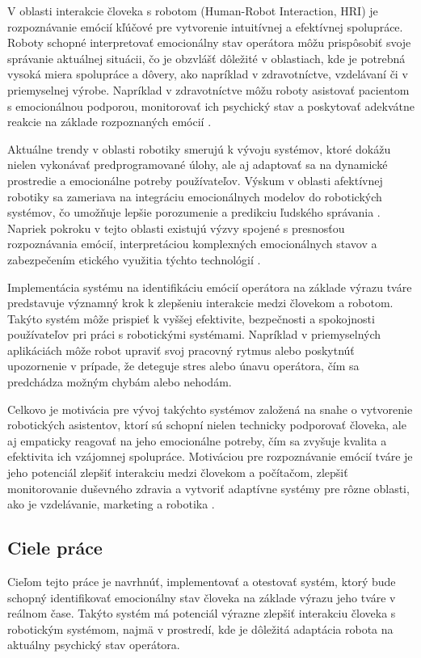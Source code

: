 V oblasti interakcie človeka s robotom (Human-Robot Interaction, HRI) je rozpoznávanie emócií kľúčové pre vytvorenie intuitívnej a efektívnej spolupráce. Roboty schopné interpretovať emocionálny stav operátora 
môžu prispôsobiť svoje správanie aktuálnej situácii, čo je obzvlášť dôležité v oblastiach, kde je potrebná vysoká miera spolupráce a dôvery, ako napríklad v zdravotníctve, vzdelávaní či v priemyselnej výrobe. 
Napríklad v zdravotníctve môžu roboty asistovať pacientom s emocionálnou podporou, monitorovať ich psychický stav a poskytovať adekvátne reakcie na základe rozpoznaných emócií \cite{article01}.

Aktuálne trendy v oblasti robotiky smerujú k vývoju systémov, ktoré dokážu nielen vykonávať predprogramované úlohy, ale aj adaptovať sa na dynamické prostredie a emocionálne potreby používateľov. 
Výskum v oblasti afektívnej robotiky sa zameriava na integráciu emocionálnych modelov do robotických systémov, čo umožňuje lepšie porozumenie a predikciu ľudského správania . Napriek pokroku v tejto oblasti existujú 
výzvy spojené s presnosťou rozpoznávania emócií, interpretáciou komplexných emocionálnych stavov a zabezpečením etického využitia týchto technológií \cite{article01}.

Implementácia systému na identifikáciu emócií operátora na základe výrazu tváre predstavuje významný krok k zlepšeniu interakcie medzi človekom a robotom. Takýto systém môže prispieť k vyššej efektivite, 
bezpečnosti a spokojnosti používateľov pri práci s robotickými systémami. Napríklad v priemyselných aplikáciách môže robot upraviť svoj pracovný rytmus alebo poskytnúť upozornenie v prípade, 
že deteguje stres alebo únavu operátora, čím sa predchádza možným chybám alebo nehodám.

Celkovo je motivácia pre vývoj takýchto systémov založená na snahe o vytvorenie robotických asistentov, ktorí sú schopní nielen technicky podporovať človeka, ale aj empaticky reagovať na jeho emocionálne potreby, čím sa zvyšuje kvalita a efektivita ich vzájomnej spolupráce.
Motiváciou pre rozpoznávanie emócií tváre je jeho potenciál zlepšiť interakciu medzi človekom a počítačom, zlepšiť monitorovanie duševného zdravia a vytvoriť adaptívne systémy pre rôzne oblasti, 
ako je vzdelávanie, marketing a robotika \cite{article01}.
\subsection{Ciele práce}
Cieľom tejto práce je navrhnúť, implementovať a otestovať systém, ktorý bude schopný identifikovať emocionálny stav človeka na základe výrazu jeho tváre v reálnom čase. Takýto systém má potenciál 
výrazne zlepšiť interakciu človeka s robotickým systémom, najmä v prostredí, kde je dôležitá adaptácia robota na aktuálny psychický stav operátora.


